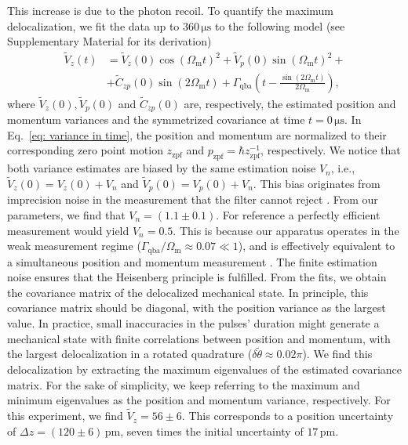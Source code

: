 \documentclass[aps,amssymb,amsmath,prl,superscriptaddress,reprint,noshowpacs]{revtex4-1}
\newcommand{\Om}{\Omega_\mathrm{m}}
\newcommand{\Gqba}{\Gamma_\mathrm{qba}}
\newcommand{\zzpf}{z_\mathrm{zpf}}
\newcommand{\pzpf}{p_\mathrm{zpf}}
\begin{document}
%
This increase is due to the photon recoil.
%
To quantify the maximum delocalization, we fit the data up to $360\,\mathrm{\mu s}$ to the following model (see Supplementary Material for its derivation)
%
\begin{eqnarray}
\label{eq: variance in time}
\widetilde{V}_z(t) &= \widetilde{V}_z(0)\cos\left(\Om t\right)^2+\widetilde{V}_p(0)\sin\left(\Om t\right)^2 + \\
&+\widetilde{C}_{zp}(0)\sin\left(2\Om t\right) + \Gqba \left(t-\frac{\sin\left(2\Om t\right)}{2\Om}\right), \nonumber
\end{eqnarray}
where $\widetilde{V}_z(0), \widetilde{V}_p(0)$ and $\widetilde{C}_{zp}(0)$ are, respectively, the estimated position and momentum variances and the symmetrized covariance at time $t=0\,\mathrm{\mu s}$.
%
In Eq.~\eqref{eq: variance in time}, the position and momentum are normalized to their corresponding zero point motion $\zzpf$ and $\pzpf=\hbar\zzpf^{-1}$, respectively.
%
We notice that both variance estimates are biased by the same estimation noise $V_n$, i.e., $\widetilde{V}_z(0)=V_z(0)+V_{n}$ and $\widetilde{V}_p(0)=V_p(0)+V_{n}$.
%
This bias originates from imprecision noise in the measurement that the filter cannot reject \cite{wieczorek_optimal_2015, rossi_observing_2019, lammers_quantum_2024}.
%
From our parameters, we find that $V_n=(1.1\pm0.1)$.
For reference a perfectly efficient measurement would yield $V_n=0.5$.
%
This is because our apparatus operates in the weak measurement regime ($\Gqba/\Om\approx0.07\ll1$), and is effectively equivalent to a simultaneous position and momentum measurement \cite{doherty_quantum_2012}.
%
The finite estimation noise ensures that the Heisenberg principle is fulfilled.
%
From the fits, we obtain the covariance matrix of the delocalized mechanical state.
%
In principle, this covariance matrix should be diagonal, with the position variance as the largest value.
%
In practice, small inaccuracies in the pulses' duration might generate a mechanical state with finite correlations between position and momentum, with the largest delocalization in a rotated quadrature ($\delta\tilde{\theta}\approx0.02 \pi$).
%
We find this delocalization by extracting the maximum eigenvalues of the estimated covariance matrix. 
%
For the sake of simplicity, we keep referring to the maximum and minimum eigenvalues as the position and momentum variance, respectively.
%
For this experiment, we find $\widetilde{V}_z=56\pm6$. This corresponds to a position uncertainty of $\Delta z= (120\pm6)\,\mathrm{pm}$, seven times the initial uncertainty of $17\,\mathrm{pm}$.
\end{document}
